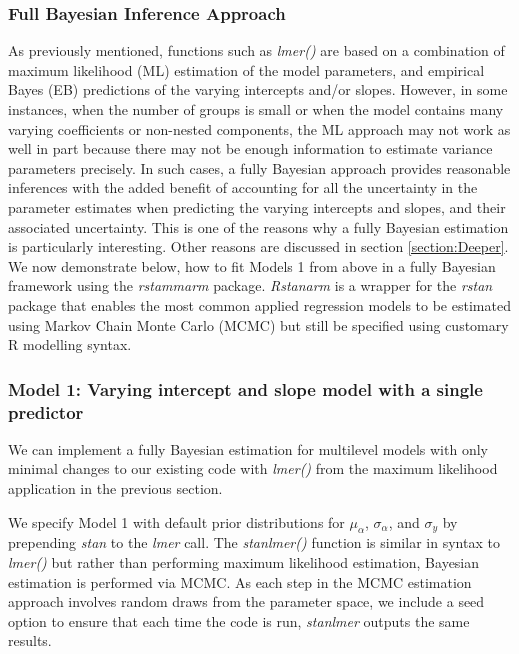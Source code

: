 \subsubsection{Full Bayesian Inference Approach}
As previously mentioned, functions such as \textit{lmer()} are based on a combination of maximum likelihood (ML) estimation of the model parameters, and empirical Bayes (EB) predictions of the varying intercepts and/or slopes. However, in some instances, when the number of groups is small or when the model contains many varying coefficients or non-nested components, the ML approach may not work as well in part because there may not be enough information to estimate variance parameters precisely. In such cases, a fully Bayesian approach provides reasonable inferences with the added benefit of accounting for all the uncertainty in the parameter estimates when predicting the varying intercepts and slopes, and their associated uncertainty. This is one of the reasons why a fully Bayesian estimation is particularly interesting. Other reasons are discussed in section \ref{section:Deeper}. We now demonstrate below, how to fit Models 1 from above in a fully Bayesian framework using the \textit{rstammarm} package. \textit{Rstanarm} is a wrapper for the \textit{rstan} package that enables the most common applied regression models to be estimated using Markov Chain Monte Carlo (MCMC) but still be specified using customary R modelling syntax.

\subsubsection*{Model 1: Varying intercept and slope model with a single predictor}

We can implement a fully Bayesian estimation for multilevel models with only minimal changes to our existing code with \textit{lmer()} from the maximum likelihood application in the previous section.

We specify Model 1 with default prior distributions for $\mu_{\alpha}$, $\sigma_{\alpha}$, and $\sigma_{y}$ by prepending \textit{stan\textunderscore} to the \textit{lmer} call. The \textit{stan\textunderscore lmer()} function is similar in syntax to \textit{lmer()} but rather than performing maximum likelihood estimation, Bayesian estimation is performed via MCMC. As each step in the MCMC estimation approach involves random draws from the parameter space, we include a seed option to ensure that each time the code is run, \textit{stan\textunderscore lmer} outputs the same results.


